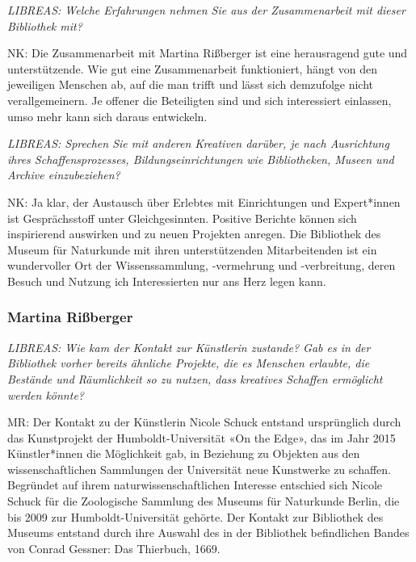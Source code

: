 \documentclass[a4paper,
fontsize=11pt,
oneside,
numbers=noperiodatend,
parskip=half-,
bibliography=totoc,
final
]{scrartcl}
\begin{document}
\emph{LIBREAS: Welche Erfahrungen nehmen Sie aus der Zusammenarbeit mit
dieser Bibliothek mit?}

NK: Die Zusammenarbeit mit Martina Rißberger ist eine herausragend gute
und unterstützende. Wie gut eine Zusammenarbeit funktioniert, hängt von
den jeweiligen Menschen ab, auf die man trifft und lässt sich demzufolge
nicht verallgemeinern. Je offener die Beteiligten sind und sich
interessiert einlassen, umso mehr kann sich daraus entwickeln.

\emph{LIBREAS: Sprechen Sie mit anderen Kreativen darüber, je nach
Ausrichtung ihres Schaffensprozesses, Bildungseinrichtungen wie
Bibliotheken, Museen und Archive einzubeziehen?}

NK: Ja klar, der Austausch über Erlebtes mit Einrichtungen und
Expert*innen ist Gesprächsstoff unter Gleichgesinnten. Positive Berichte
können sich inspirierend auswirken und zu neuen Projekten anregen. Die
Bibliothek des Museum für Naturkunde mit ihren unterstützenden
Mitarbeitenden ist ein wundervoller Ort der Wissenssammlung, -vermehrung
und -verbreitung, deren Besuch und Nutzung ich Interessierten nur ans
Herz legen kann.

\hypertarget{martina-riuxdfberger}{%
\subsubsection{Martina Rißberger}\label{martina-riuxdfberger}}

\emph{LIBREAS: Wie kam der Kontakt zur Künstlerin zustande? Gab es in
der Bibliothek vorher bereits ähnliche Projekte, die es Menschen
erlaubte, die Bestände und Räumlichkeit so zu nutzen, dass kreatives
Schaffen ermöglicht werden könnte?}

MR: Der Kontakt zu der Künstlerin Nicole Schuck entstand ursprünglich
durch das Kunstprojekt der Humboldt-Universität «On the Edge», das im
Jahr 2015 Künstler*innen die Möglichkeit gab, in Beziehung zu Objekten
aus den wissenschaftlichen Sammlungen der Universität neue Kunstwerke zu
schaffen. Begründet auf ihrem naturwissenschaftlichen Interesse
entschied sich Nicole Schuck für die Zoologische Sammlung des Museums
für Naturkunde Berlin, die bis 2009 zur Humboldt-Universität gehörte.
Der Kontakt zur Bibliothek des Museums entstand durch ihre Auswahl des
in der Bibliothek befindlichen Bandes von Conrad Gessner: Das Thierbuch,
1669.
\end{document}
